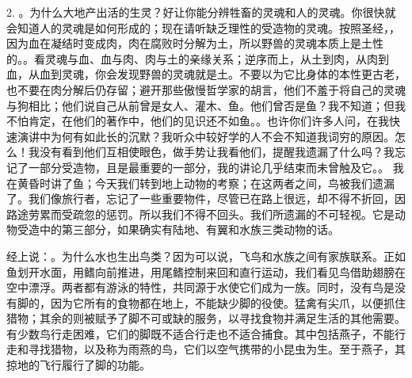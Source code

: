 2. 。为什么大地产出活的生灵？好让你能分辨牲畜的灵魂和人的灵魂。你很快就会知道人的灵魂是如何形成的；现在请听缺乏理性的受造物的灵魂。按照圣经，，因为血在凝结时变成肉，肉在腐败时分解为土，所以野兽的灵魂本质上是土性的。。看灵魂与血、血与肉、肉与土的亲缘关系；逆序而上，从土到肉，从肉到血，从血到灵魂，你会发现野兽的灵魂就是土。不要以为它比身体的本性更古老，也不要在肉分解后仍存留；避开那些傲慢哲学家的胡言，他们不羞于将自己的灵魂与狗相比；他们说自己从前曾是女人、灌木、鱼。他们曾否是鱼？我不知道；但我不怕肯定，在他们的著作中，他们的见识还不如鱼。。也许你们许多人问，在我快速演讲中为何有如此长的沉默？我听众中较好学的人不会不知道我词穷的原因。怎么！我没有看到他们互相使眼色，做手势让我看他们，提醒我遗漏了什么吗？我忘记了一部分受造物，且是最重要的一部分，我的讲论几乎结束而未曾触及它。。 我在黄昏时讲了鱼；今天我们转到地上动物的考察；在这两者之间，鸟被我们遗漏了。我们像旅行者，忘记了一些重要物件，尽管已在路上很远，却不得不折回，因路途劳累而受疏忽的惩罚。所以我们不得不回头。我们所遗漏的不可轻视。它是动物受造中的第三部分，如果确实有陆地、有翼和水族三类动物的话。\par

经上说：。为什么水也生出鸟类？因为可以说，飞鸟和水族之间有家族联系。正如鱼划开水面，用鳍向前推进，用尾鳍控制来回和直行运动，我们看见鸟借助翅膀在空中漂浮。两者都有游泳的特性，共同源于水使它们成为一族。同时，没有鸟是没有脚的，因为它所有的食物都在地上，不能缺少脚的役使。猛禽有尖爪，以便抓住猎物；其余的则被赋予了脚不可或缺的服务，以寻找食物并满足生活的其他需要。有少数鸟行走困难，它们的脚既不适合行走也不适合捕食。其中包括燕子，不能行走和寻找猎物，以及称为雨燕的鸟，它们以空气携带的小昆虫为生。至于燕子，其掠地的飞行履行了脚的功能。\par


